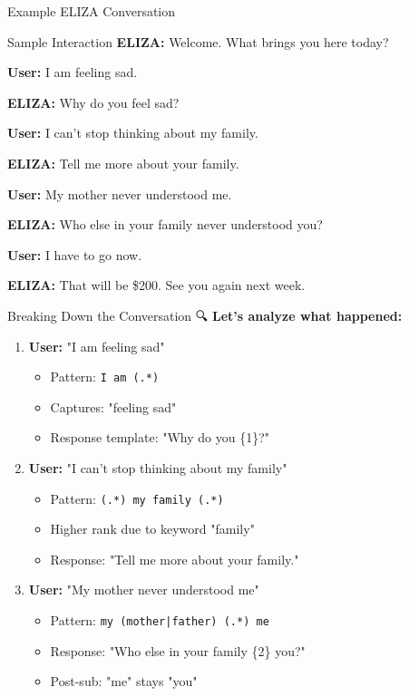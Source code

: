 \documentclass[aspectratio=169]{beamer}
\begin{document}
\begin{frame}{Example ELIZA Conversation 💬}
\begin{block}{Sample Interaction}
\textbf{ELIZA:} Welcome. What brings you here today?

\textbf{User:} I am feeling sad.

\textbf{ELIZA:} Why do you feel sad?

\textbf{User:} I can't stop thinking about my family.

\textbf{ELIZA:} Tell me more about your family.

\textbf{User:} My mother never understood me.

\textbf{ELIZA:} Who else in your family never understood you?

\textbf{User:} I have to go now.

\textbf{ELIZA:} That will be \$200. See you again next week.
\end{block}
\end{frame}

\begin{frame}[shrink=10]{Breaking Down the Conversation 🔍}
\textbf{Let's analyze what happened:}

\vspace{0.3cm}

\begin{enumerate}\setlength{\itemsep}{0pt}
    \item \textbf{User:} "I am feeling sad"
    \begin{itemize}\setlength{\itemsep}{0pt}
        \item Pattern: \texttt{I am (.*)}
        \item Captures: "feeling sad"
        \item Response template: "Why do you \{1\}?"
    \end{itemize}

    \vspace{0.2cm}

    \item \textbf{User:} "I can't stop thinking about my family"
    \begin{itemize}\setlength{\itemsep}{0pt}
        \item Pattern: \texttt{(.*) my family (.*)}
        \item Higher rank due to keyword "family"
        \item Response: "Tell me more about your family."
    \end{itemize}

    \vspace{0.2cm}

    \item \textbf{User:} "My mother never understood me"
    \begin{itemize}\setlength{\itemsep}{0pt}
        \item Pattern: \texttt{my (mother|father) (.*) me}
        \item Response: "Who else in your family \{2\} you?"
        \item Post-sub: "me" stays "you"
    \end{itemize}
\end{enumerate}
\end{frame}
\end{document}

